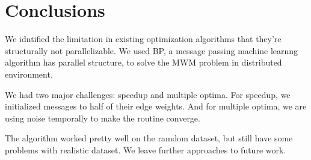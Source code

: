 
\section{Conclusions}

We idntified the limitation in existing optimization algorithms that they're structurally not parallelizable. We used BP, a message passing machine learnng algorithm has parallel structure, to solve the MWM problem in distributed environment. 

We had two major challenges: speedup and multiple optima. For speedup, we initialized messages to half of their edge weights. And for multiple optima, we are using noise temporally to make the routine converge. 

The algorithm worked pretty well on the ramdom dataset, but still have some problems with realistic dataset. We leave further approaches to future work. 

